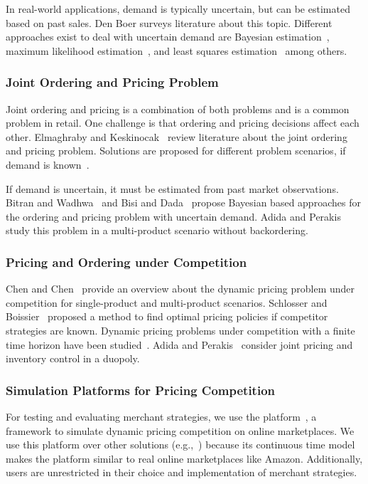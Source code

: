 In real-world applications, demand is typically uncertain, but can be estimated based on past sales.
Den Boer\cite{den2015dynamic} surveys literature about this topic.
Different approaches exist to deal with uncertain demand are Bayesian estimation~\cite{araman2011revenue}, maximum likelihood estimation~\cite{DBLP:journals/ior/BroderR12}, and least squares estimation~\cite{le2008data} among others.

\subsubsection*{Joint Ordering and Pricing Problem}
Joint ordering and pricing is a combination of both problems and is a common problem in retail.
One challenge is that ordering and pricing decisions affect each other.
Elmaghraby and Keskinocak~\cite{elmaghraby2003dynamic} review literature about the joint ordering and pricing problem.
Solutions are proposed for different problem scenarios, if demand is known~\cite{thomas1970price,DBLP:journals/ior/FedergruenH99,chen2003coordinating,simchi2014integration}.

If demand is uncertain, it must be estimated from past market observations.
Bitran and Wadhwa~\cite{bitran1996methodology} and Bisi and Dada~\cite{bisi2007dynamic} propose Bayesian based approaches for the ordering and pricing problem with uncertain demand.
Adida and Perakis~\cite{DBLP:journals/mp/AdidaP06,DBLP:journals/anor/AdidaP10} study this problem in a multi-product scenario without backordering.

\subsubsection*{Pricing and Ordering under Competition}
Chen and Chen~\cite{chen2015recent} provide an overview about the dynamic pricing problem under competition for single-product and multi-product scenarios.
Schlosser and Boissier~\cite{Schlosser_2017} proposed a method to find optimal pricing policies if competitor strategies are known.
Dynamic pricing problems under competition with a finite time horizon have been studied~\cite{DBLP:journals/mansci/Martinez-de-AlbenizT11,Schlosser_2018}.
Adida and Perakis~\cite{DBLP:journals/ior/AdidaP10} consider joint pricing and inventory control in a duopoly.

\subsubsection*{Simulation Platforms for Pricing Competition}
For testing and evaluating merchant strategies, we use the \pricewars platform~\cite{edoc2017pricewars}, a framework to simulate dynamic pricing competition on online marketplaces.
We use this platform over other solutions (e.g.,~\cite{morris2001simulation,DBLP:journals/ecr/DiMiccoMG03,DBLP:journals/icae/PintoVSPSM14}) because its continuous time model makes the platform similar to real online marketplaces like Amazon.
Additionally, users are unrestricted in their choice and implementation of merchant strategies.

